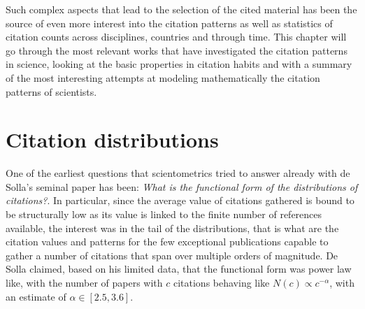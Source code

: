 Such complex aspects that lead to the selection of the cited material has been the source of even more interest into the citation patterns as well as statistics of citation counts across
disciplines, countries and through time. This chapter will go through the most relevant works that have investigated the citation patterns in science, looking at the basic properties in citation
habits and with a summary of the most interesting attempts at modeling mathematically the citation patterns of scientists.



\section{Citation distributions} \label{sec:Citation Distributions}
 
One of the earliest questions that scientometrics tried to answer already with de Solla's seminal paper \cite{deSollaPrice510} has been: \textit{What is the functional form of the distributions of citations?}.
In particular, since the average value of citations gathered is bound to be structurally low as its value is linked to the finite number of 
references available, the interest was in the tail of the distributions, that is what are the citation values and patterns for the 
few exceptional publications capable to gather a number of citations that span over multiple orders of magnitude.
De Solla claimed, based on his limited data, that the functional form was power law like, with the number of papers with $c$ citations behaving like $N(c) \propto c^{-\alpha}$, with an estimate of $\alpha \in [2.5,3.6]$. 

